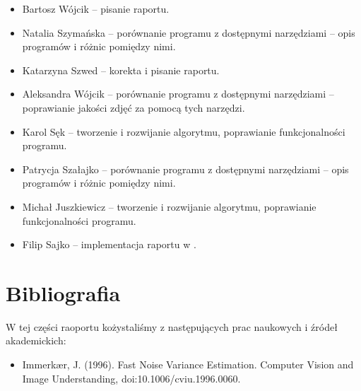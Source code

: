 \documentclass[]{mwart}
\begin{document}
\begin{itemize}
    \item Bartosz Wójcik -- pisanie raportu.
    \item Natalia Szymańska -- porównanie programu z dostępnymi narzędziami -- opis programów i różnic pomiędzy nimi. %
    \item Katarzyna Szwed -- korekta i pisanie raportu.
    \item Aleksandra Wójcik -- porównanie programu z dostępnymi narzędziami -- poprawianie jakości zdjęć za pomocą tych narzędzi.
    \item Karol Sęk -- tworzenie i rozwijanie algorytmu, poprawianie funkcjonalności programu.
    \item Patrycja Szałajko -- porównanie programu z dostępnymi narzędziami -- opis programów i różnic pomiędzy nimi.
    \item Michał Juszkiewicz -- tworzenie i rozwijanie algorytmu, poprawianie funkcjonalności programu.
    \item Filip Sajko -- implementacja raportu w \LaTeXe{}.
\end{itemize}


\section{Bibliografia}
W tej części raoportu kożystaliśmy z następujących prac naukowych i źródeł akademickich:
\begin{itemize}
    \item Immerkær, J. (1996). Fast Noise Variance Estimation. Computer Vision and Image Understanding, doi:10.1006/cviu.1996.0060.
\end{itemize}
\end{document}
